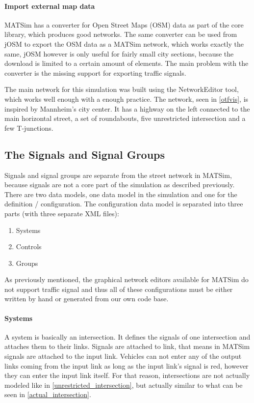 \paragraph{Import external map data} MATSim has a converter for Open Street Maps (OSM) data as part of the core library, which produces good networks. The same converter can be used from jOSM to export the OSM data as a MATSim network, which works exactly the same, jOSM however is only useful for fairly small city sections, because the download is limited to a certain amount of elements. The main problem with the converter is the missing support for exporting traffic signals.

The main network for this simulation was built using the NetworkEditor tool, which works well enough with a enough practice. The network, seen in \autoref{otfvis}, is inspired by Mannheim's city center. It has a highway on the left connected to the main horizontal street, a set of roundabouts, five unrestricted intersection and a few T-junctions.

\subsection*{The Signals and Signal Groups}

Signals and signal groups are separate from the street network in MATSim, because signals are not a core part of the simulation as described previously. There are two data models, one data model in the simulation and one for the definition / configuration. The configuration data model is separated into three parts (with three separate XML files):

\begin{enumerate}
	\item Systems
	\item Controls
	\item Groups
\end{enumerate}

As previously mentioned, the graphical network editors available for MATSim do not support traffic signal and thus all of these configurations must be either written by hand or generated from our own code base.

\paragraph{Systems} A system is basically an intersection. It defines the signals of one intersection and attaches them to their links. Signals are attached to link, that means in MATSim signals are attached to the input link. Vehicles can not enter any of the output links coming from the input link as long as the input link's signal is red, however they can enter the input link itself. For that reason, intersections are not actually modeled like in \autoref{unrestricted_intersection}, but actually similar to what can be seen in \autoref{actual_intersection}.

